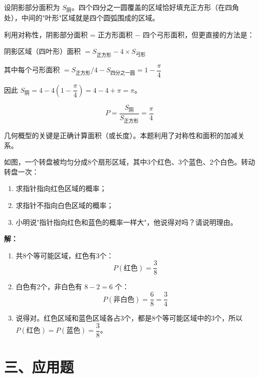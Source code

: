 \documentclass[12pt, a4paper]{ctexart}
\begin{document}
设阴影部分面积为 $S_{\text{阴}}$。四个四分之一圆覆盖的区域恰好填充正方形（在四角处），中间的"叶形"区域就是四个圆弧围成的区域。

利用对称性，阴影部分面积 = 正方形面积 $-$ 四个弓形面积，但更直接的方法是：

阴影区域（四叶形）面积 $= S_{\text{正方形}} - 4 \times S_{\text{弓形}}$

其中每个弓形面积 $= S_{\text{正方形}} / 4 - S_{\text{四分之一圆}} = 1 - \dfrac{\pi}{4}$

因此 $S_{\text{阴}} = 4 - 4\left(1 - \dfrac{\pi}{4}\right) = 4 - 4 + \pi = \pi$。

\[
  P = \frac{S_{\text{阴}}}{S_{\text{正方形}}} = \frac{\pi}{4}
\]

\begin{tipbox}[方法总结]
几何概型的关键是正确计算面积（或长度）。本题利用了对称性和面积的加减关系。
\end{tipbox}

\begin{examplebox}
如图，一个转盘被均匀分成8个扇形区域，其中3个红色、3个蓝色、2个白色。转动转盘一次：
\begin{enumerate}[label=(\arabic*)]
  \item 求指针指向红色区域的概率；
  \item 求指针不指向白色区域的概率；
  \item 小明说"指针指向红色和蓝色的概率一样大"，他说得对吗？请说明理由。
\end{enumerate}
\end{examplebox}

\textbf{解：}
\begin{enumerate}[label=(\arabic*)]
  \item 共8个等可能区域，红色有3个：
  \[
    P(\text{红色}) = \frac{3}{8}
  \]

  \item 白色有2个，非白色有 $8 - 2 = 6$ 个：
  \[
    P(\text{非白色}) = \frac{6}{8} = \frac{3}{4}
  \]

  \item 说得对。红色区域和蓝色区域各占3个，都是8个等可能区域中的3个，所以 $P(\text{红色}) = P(\text{蓝色}) = \dfrac{3}{8}$。
\end{enumerate}

\newpage
\section*{\textcolor{apppurple}{三、应用题}}
\end{document}
